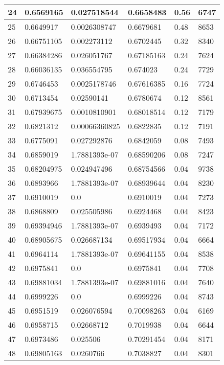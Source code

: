 \begin{longtable}{|l|l|l|l|l|l|}
24 & 0.6569165 & 0.027518544 & 0.6658483 & 0.56 & 6747 \\ \hline 
25 & 0.6649917 & 0.0026308747 & 0.6679681 & 0.48 & 8653 \\ \hline 
26 & 0.66751105 & 0.002273112 & 0.6702445 & 0.32 & 8340 \\ \hline 
27 & 0.66384286 & 0.026051767 & 0.67185163 & 0.24 & 7624 \\ \hline 
28 & 0.66036135 & 0.036554795 & 0.674023 & 0.24 & 7729 \\ \hline 
29 & 0.6746453 & 0.0025178746 & 0.67616385 & 0.16 & 7724 \\ \hline 
30 & 0.6713454 & 0.02590141 & 0.6780674 & 0.12 & 8561 \\ \hline 
31 & 0.67939675 & 0.0010810901 & 0.68018514 & 0.12 & 7179 \\ \hline 
32 & 0.6821312 & 0.00066360825 & 0.6822835 & 0.12 & 7191 \\ \hline 
33 & 0.6775091 & 0.027292876 & 0.6842059 & 0.08 & 7493 \\ \hline 
34 & 0.6859019 & 1.7881393e-07 & 0.68590206 & 0.08 & 7247 \\ \hline 
35 & 0.68204975 & 0.024947496 & 0.68754566 & 0.04 & 9738 \\ \hline 
36 & 0.6893966 & 1.7881393e-07 & 0.68939644 & 0.04 & 8230 \\ \hline 
37 & 0.6910019 & 0.0 & 0.6910019 & 0.04 & 7273 \\ \hline 
38 & 0.6868809 & 0.025505986 & 0.6924468 & 0.04 & 8423 \\ \hline 
39 & 0.69394946 & 1.7881393e-07 & 0.6939493 & 0.04 & 7172 \\ \hline 
40 & 0.68905675 & 0.026687134 & 0.69517934 & 0.04 & 6664 \\ \hline 
41 & 0.6964114 & 1.7881393e-07 & 0.69641155 & 0.04 & 8538 \\ \hline 
42 & 0.6975841 & 0.0 & 0.6975841 & 0.04 & 7708 \\ \hline 
43 & 0.69881034 & 1.7881393e-07 & 0.69881016 & 0.04 & 7640 \\ \hline 
44 & 0.6999226 & 0.0 & 0.6999226 & 0.04 & 8743 \\ \hline 
45 & 0.6951519 & 0.026076594 & 0.70098263 & 0.04 & 6169 \\ \hline 
46 & 0.6958715 & 0.02668712 & 0.7019938 & 0.04 & 6644 \\ \hline 
47 & 0.6973486 & 0.025506 & 0.70291454 & 0.04 & 8171 \\ \hline 
48 & 0.69805163 & 0.0260766 & 0.7038827 & 0.04 & 8301 \\ \hline 

\end{longtable}
